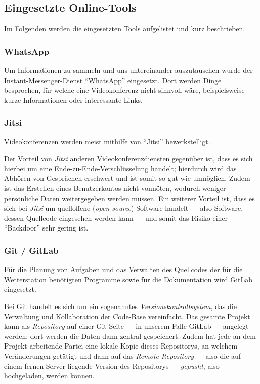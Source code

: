 \documentclass[a4paper,12pt]{article}
\begin{document}
\subsection{Eingesetzte Online-Tools}
Im Folgenden werden die eingesetzten Tools aufgelistet und kurz beschrieben.

\subsubsection{WhatsApp}
Um Informationen zu sammeln und uns untereinander auszutauschen wurde der Instant-Messenger-Dienst "`WhatsApp"' eingesetzt. Dort werden Dinge besprochen, für welche eine Videokonferenz nicht sinnvoll wäre, beispielsweise kurze Informationen oder interessante Links.

\subsubsection{Jitsi}
Videokonferenzen werden meist mithilfe von "`Jitsi"' bewerkstelligt.

Der Vorteil von \textit{Jitsi} anderen Videokonferenzdiensten gegenüber ist, dass es sich hierbei um eine Ende-zu-Ende-Verschlüsselung handelt; hierdurch wird das Abhören von Gesprächen erschwert und ist somit so gut wie unmöglich. Zudem ist das Erstellen eines Benutzerkontos nicht vonnöten, wodurch weniger persönliche Daten weitergegeben werden müssen. Ein weiterer Vorteil ist, dass es sich bei \textit{Jitsi} um quelloffene (\textit{open source}) Software handelt — also Software, dessen Quellcode eingesehen werden kann — und somit das Risiko einer "`Backdoor"' sehr gering ist.

\subsubsection{Git / GitLab}
Für die Planung von Aufgaben und das Verwalten des Quellcodes der für die Wetterstation benötigten Programme sowie für die Dokumentation wird GitLab eingesetzt.

Bei Git handelt es sich um ein sogenanntes \textit{Versionskontrollsystem}, das die Verwaltung und Kollaboration der Code-Base vereinfacht. 
Das gesamte Projekt kann als \textit{Repository} auf einer Git-Seite — in unserem Falle GitLab — angelegt werden; dort werden die Daten dann zentral gespeichert.
Zudem hat jede an dem Projekt arbeitende Partei eine lokale Kopie dieses Repositorys, an welchem Veränderungen getätigt und dann auf das \textit{Remote Repository} — also die auf einem fernen Server liegende Version des Repositorys — \textit{gepusht}, also hochgeladen, werden können.
\end{document}
